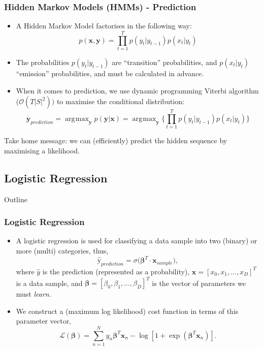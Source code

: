 \documentclass{beamer}
\DeclareMathOperator*{\argmax}{\arg\!\max}
\begin{document}
\begin{frame}
\frametitle{Hidden Markov Models (HMMs) - Prediction}
\begin{itemize}
\item A Hidden Markov Model factorises in the following way:
$$p(\mathbf{x}, \mathbf{y}) = \prod_{t=1}^T p(y_t | y_{t-1})p(x_t | y_t)$$
\item The probabilities $p(y_t | y_{t-1})$ are ``transition'' probabilities, and $p(x_t | y_t) $``emission'' probabilities, and must be calculated in advance.
\item When it comes to prediction, we use dynamic programming Viterbi algorithm ($\mathcal{O}(T|S|^2))$ to maximise the conditional distribution:
$$\textbf{y}_{prediction} = \argmax_{\textbf{y}} p(\textbf{y} | \textbf{x}) = \argmax_{\textbf{y}}\Bigg\{\prod_{t=1}^T p(y_t | y_{t-1})p(x_t | y_t)\Bigg\}$$
\end{itemize}
Take home message: we can (efficiently) predict the hidden sequence by maximising a likelihood.
\end{frame}


\subsection{Logistic Regression}


\begin{frame}[noframenumbering]{Outline}
\tableofcontents[currentsubsection]
\end{frame}


\begin{frame}
\frametitle{Logistic Regression}
\begin{itemize}
\item A logistic regression is used for classifying a data sample into two (binary) or more (multi) categories, thus,
$$\hat{\text{y}}_{prediction} = \sigma\big(\boldsymbol\beta^{T} \cdot \boldsymbol{x}_{sample}\big),$$
where $\hat{y}$ is the prediction (represented as a probability), $\boldsymbol{x} = [x_0, x_1, ..., x_D]^T$ is a data sample, and $\boldsymbol\beta = [\beta_0, \beta_1, ..., \beta_D]^T$ is the vector of parameters we must \emph{learn}.
\item We construct a (maximum log likelihood) cost function in terms of this parameter vector,
$$\mathcal{L}(\boldsymbol\beta) = \sum_{n=1}^N y_n\boldsymbol\beta^T\boldsymbol{x}_n - \log[1 + \exp(\boldsymbol\beta^T\boldsymbol{x}_n)].$$
\end{itemize}
\end{frame}
\end{document}
